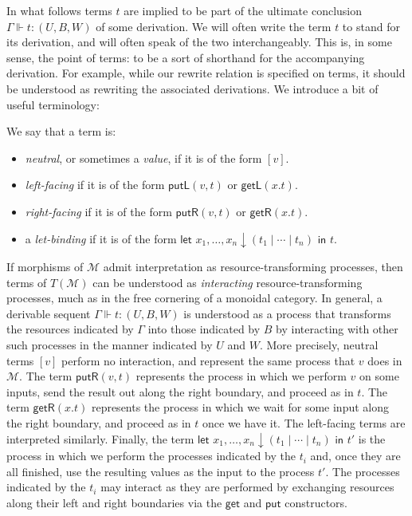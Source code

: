 \documentclass[twoside,11pt,final]{entics}
\newcommand{\getl}{\mathsf{getL}}
\newcommand{\putr}{\mathsf{putR}}
\newcommand{\getr}{\mathsf{getR}}
\newcommand{\putl}{\mathsf{putL}}
\newcommand{\asn}{\downarrow}
\newcommand{\seq}{,\!\ldots\!,}
\begin{document}
In what follows terms $t$ are implied to be part of the ultimate conclusion $\Gamma \Vdash t : (U,B,W)$ of some derivation. We will often write the term $t$ to stand for its derivation, and will often speak of the two interchangeably. This is, in some sense, the point of terms: to be a sort of shorthand for the accompanying derivation. For example, while our rewrite relation is specified on terms, it should be understood as rewriting the associated derivations. We introduce a bit of useful terminology:
\begin{definition}
  We say that a term is:
  \begin{itemize}
  \item \emph{neutral}, or sometimes a \emph{value}, if it is of the form $[v]$.
  \item \emph{left-facing} if it is of the form $\putl(v,t)$ or $\getl(x.t)$.
  \item \emph{right-facing} if it is of the form $\putr(v,t)$ or $\getr(x.t)$.
  \item a \emph{let-binding} if it is of the form $\textsf{let } x_1 \seq x_n \asn (t_1 \mid \cdots \mid t_n) \textsf{ in } t$.
  \end{itemize}
\end{definition}

If morphisms of $\mathcal{M}$ admit interpretation as resource-transforming processes, then terms of $T(\mathcal{M})$ can be understood as \emph{interacting} resource-transforming processes, much as in the free cornering of a monoidal category. In general, a derivable sequent $\Gamma \Vdash t : (U,B,W)$ is understood as a process that transforms the resources indicated by $\Gamma$ into those indicated by $B$ by interacting with other such processes in the manner indicated by $U$ and $W$. More precisely, neutral terms $[v]$ perform no interaction, and represent the same process that $v$ does in $\mathcal{M}$. The term $\putr(v,t)$ represents the process in which we perform $v$ on some inputs, send the result out along the right boundary, and proceed as in $t$. The term $\getr(x.t)$ represents the process in which we wait for some input along the right boundary, and proceed as in $t$ once we have it. The left-facing terms are interpreted similarly. Finally, the term $\textsf{let } x_1 \seq x_n \asn (t_1 \mid \cdots \mid t_n) \textsf{ in } t'$ is the process in which we perform the processes indicated by the $t_i$ and, once they are all finished, use the resulting values as the input to the process $t'$. The processes indicated by the $t_i$ may interact as they are performed by exchanging resources along their left and right boundaries via the $\textsf{get}$ and $\textsf{put}$ constructors.
\end{document}
